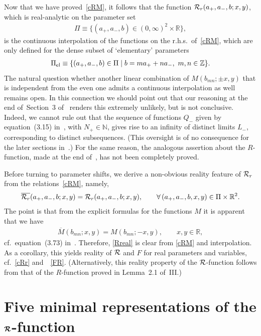 \documentclass[11pt]{article}
\numberwithin{equation}{section}
\newcommand{\Z}{{\mathbb Z}}
\newcommand{\N}{{\mathbb N}}
\newcommand{\R}{{\mathbb R}}
\newcommand{\cR}{{\cal R}}
\newcommand{\aaa}{a_{+},a_{-}}
\begin{document}
Now that we have proved~\eqref{cRM},  it follows that the function $\cR_r(\aaa,b;x,y)$, which is real-analytic on the parameter set
\begin{gather}\label{Pi}
\Pi\equiv \big\{(\aaa,b)\in (0,\infty)^2\times\R\big\},
\end{gather}
 is the continuous interpolation of the functions on the r.h.s.\ of~\eqref{cRM}, which are only def\/ined for the dense subset of `elementary' parameters
\begin{gather}\label{elem}
\Pi_{\rm el}\equiv \{ (\aaa,b)\in\Pi \mid b=ma_{+}+na_{-},\ m,n\in\Z\}.
\end{gather}
The natural question whether another linear combination of $M(b_{mn};\pm x,y)$ that is independent from the even one admits a continuous interpolation as well remains open. In this connection we should point out  that our reasoning at the end of~Section~3 of~\cite{koor} renders this extremely unlikely, but is not conclusive. Indeed, we cannot rule out that the sequence of functions $Q_{-}$ given by equation~(3.15) in~\cite{koor}, with $N_{+}\in\N$, gives rise to an inf\/inity of distinct limits $L_{-}$, corresponding to distinct subsequences. (This oversight is of no consequence for the later sections in~\cite{koor}.) For the same reason, the analogous assertion about the $R$-function, made at the end of~\cite{Rsurv}, has not been completely proved.

Before turning to parameter shifts, we derive  a non-obvious reality feature of $\cR_r$ from the  relations~\eqref{cRM}, namely,
\begin{gather}\label{Rreal}
\overline{\cR_r}(\aaa,b;x,y)=\cR_r(\aaa,b;x,y),\qquad \forall\, (\aaa,b,x,y)\in\Pi\times\R^2.
\end{gather}
The point is that from the explicit formulas for the functions $M$ it is apparent that we have
\begin{gather}
\overline{M}(b_{mn};x,y)=M(b_{mn};-x,y), \qquad x,y\in\R,
\end{gather}
cf.~equation~(3.73) in~\cite{GLFII}. Therefore, \eqref{Rreal} is clear from \eqref{cRM} and interpolation. As a corollary, this yields reality of $\cR$ and $F$ for real parameters and variables, cf.~\eqref{cRr} and~~\eqref{FR}. (Alternatively, this reality property of the $\cR$-function follows from that of the $R$-function proved in Lemma~2.1 of~III.)

\setcounter{section}{2}
\setcounter{subsection}{4}
\setcounter{subsubsection}{0}
\setcounter{equation}{96}
\section[Five minimal representations of the $\cR$-function]{Five minimal representations of the $\boldsymbol{\cR}$-function}\label{section3}
\end{document}
